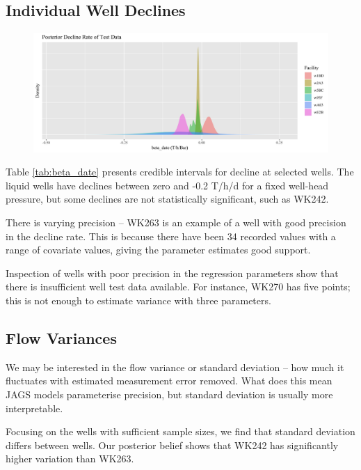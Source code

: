 \documentclass[a4paper, 12pt]{article}
\begin{document}
\subsection{Individual Well Declines}

\begin{figure}
  \centering
  \includegraphics[width=\linewidth]{media/beta_date}
  \label{fig:beta_date}
\end{figure}



Table \ref{tab:beta_date} presents credible intervals for decline at selected wells. The liquid wells have declines between zero and -0.2 T/h/d for a fixed well-head pressure, but some declines are not statistically significant, such as WK242.

There is varying precision -- WK263 is an example of a well with good precision in the decline rate. This is because there have been 34 recorded values with a range of covariate values, giving the parameter estimates good support.

Inspection of wells with poor precision in the regression parameters show that there is insufficient well test data available. For instance, WK270 has five points; this is not enough to estimate variance with three parameters.

\subsection{Flow Variances}
We may be interested in the flow variance or standard deviation -- how much it fluctuates with estimated measurement error removed. What does this mean JAGS models parameterise precision, but standard deviation  is usually more interpretable.

Focusing on the wells with sufficient sample sizes, we find that standard deviation differs between wells. Our posterior belief shows that WK242 has significantly higher variation than WK263.
\end{document}
